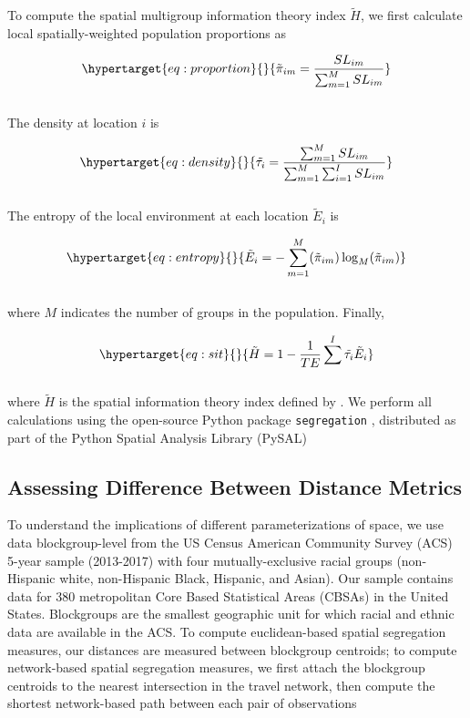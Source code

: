 \documentclass[
  10pt,
]{article}
\begin{document}
To compute the spatial multigroup information theory index
\(\tilde{H}\), we first calculate local spatially-weighted population
proportions as

\begin{equation}\protect\hypertarget{eq:proportion}{}{
\tilde{\pi}_{im} = \frac{SL_{im}}{\sum^M_{m=1}{SL_{im}}}
}\label{eq:proportion}\end{equation}\\
The density at location \(i\) is

\begin{equation}\protect\hypertarget{eq:density}{}{
\tilde{\tau_i} = \frac{\sum^M_{m=1}{SL_{im}}}{\sum^M_{m=1}\sum^I_{i=1}{SL_{im}}}
}\label{eq:density}\end{equation}\\
The entropy of the local environment at each location \(\tilde{E}_i\) is

\begin{equation}\protect\hypertarget{eq:entropy}{}{
\tilde{E}_i = -\sum^M_{m=1}(\tilde{\pi}_{im})\log_M(\tilde{\pi}_{im})
}\label{eq:entropy}\end{equation}\\
where \(M\) indicates the number of groups in the population. Finally,

\begin{equation}\protect\hypertarget{eq:sit}{}{
\tilde{H} = 1-\frac{1}{TE} \sum^I \tilde{\tau_i}\tilde{E}_i
}\label{eq:sit}\end{equation}\\
where \(\tilde{H}\) is the spatial information theory index defined by
\citet{reardon2004MeasuresSpatial}. We perform all calculations using
the open-source Python package \texttt{segregation}
\citep{cortes2020OpensourceFramework}, distributed as part of the Python
Spatial Analysis Library (PySAL) \citep{rey2021PySALEcosystem}

\hypertarget{assessing-difference-between-distance-metrics}{%
\subsection{Assessing Difference Between Distance
Metrics}\label{assessing-difference-between-distance-metrics}}

To understand the implications of different parameterizations of space,
we use data blockgroup-level from the US Census American Community
Survey (ACS) 5-year sample (2013-2017) with four mutually-exclusive
racial groups (non-Hispanic white, non-Hispanic Black, Hispanic, and
Asian). Our sample contains data for 380 metropolitan Core Based
Statistical Areas (CBSAs) in the United States. Blockgroups are the
smallest geographic unit for which racial and ethnic data are available
in the ACS. To compute euclidean-based spatial segregation measures, our
distances are measured between blockgroup centroids; to compute
network-based spatial segregation measures, we first attach the
blockgroup centroids to the nearest intersection in the travel network,
then compute the shortest network-based path between each pair of
observations
\end{document}
